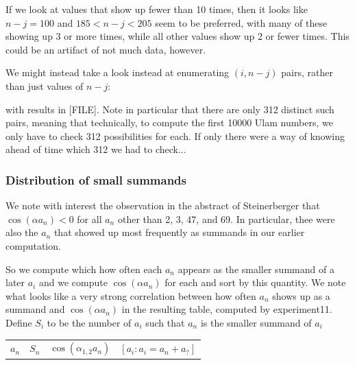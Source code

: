 \documentclass{article}
\theoremstyle{definition}
\theoremstyle{remark}
\numberwithin{equation}{section}
\begin{document}
{If we look at values that show up fewer than 10 times, then it looks
like $n-j = 100$ and $185 < n-j < 205$ seem to be preferred, with many
of these showing up 3 or more times, while all other values show up 2
or fewer times.  This could be an artifact of not much data, however.

We might instead take a look instead at enumerating $(i,n-j)$ pairs,
rather than just values of $n-j$:


with results in [FILE].  Note in particular that there are
only 312 distinct such pairs, meaning that technically, to compute the
first 10000 Ulam numbers, we only have to check 312 possibilities for
each.  If only there were a way of knowing ahead of time which 312 we
had to check...

\subsubsection{Distribution of small summands}

We note with interest the observation in the abstract of Steinerberger
that $\cos(\alpha a_n) < 0$ for all $a_n$ other than 2, 3, 47, and 69.  In
particular, thee were also the $a_n$ that showed up most frequently as
summands in our earlier computation.

So we compute which how often each $a_n$ appears as the smaller
summand of a later $a_i$ and we compute $\cos(\alpha a_n)$ for each
and sort by this quantity.  We note what looks like a very strong
correlation between how often $a_n$ shows up as a summand and
$\cos(\alpha a_n)$ in the resulting table, computed by experiment11.
Define $S_i$ to be the number of $a_i$ such that $a_n$ is the smaller
summand of $a_i$

\begin{tabular}{llll}
$a_n$ & $S_n$ & $\cos(\alpha_{1,2}  a_n)$ & $[a_i : a_i = a_n + a_?]$\\


\end{tabular}}
\end{document}
